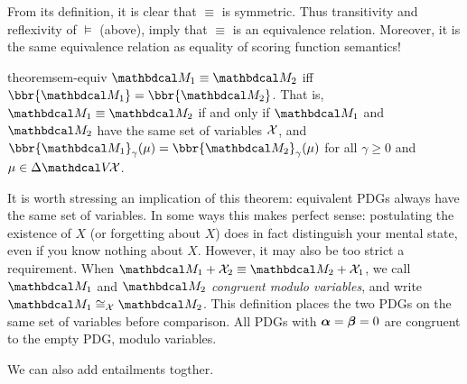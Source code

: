 From its definition, it is clear that $\equiv$ is symmetric.
Thus transitivity and reflexivity of $\models$ (above), imply that
$\equiv$ is an equivalence relation. Moreover, it is the same equivalence relation as equality of scoring function semantics!

\begin{linked}{theorem}{sem-equiv}
    $\dg M_1 \equiv \dg M_2$ iff $\bbr{\dg M_1} = \bbr{\dg M_2}$.
    That is, $\dg M_1 \equiv \dg M_2$ if and only if 
    $\dg M_1$ and $\dg M_2$ have the same set of variables $\mathcal X$, and
    $\bbr{\dg M_1}_\gamma(\mu) = \bbr{\dg M_2}_\gamma(\mu)$
    for all $\gamma \ge 0$ and $\mu \in \Delta\V\!\X$.
\end{linked}    


It is worth stressing an implication of this theorem: equivalent PDGs always have the same set of variables.
In some ways this makes perfect sense: postulating the existence of $X$ (or forgetting about $X$) does in fact distinguish your mental state, even if you know nothing about $X$. 
However, it may also be too strict a requirement.
    When $\dg M_1 + \X_2 \equiv \dg M_2 + \X_1$,
    we call $\dg M_1$ and $\dg M_2$ \emph{congruent modulo variables}, and write $\dg M_1 \cong_\X \dg M_2$.
    This definition places the two PDGs on the same set of variables before comparison.  All PDGs with $\boldsymbol\alpha = \boldsymbol\beta = 0$ are congruent to the empty PDG, modulo variables. 



We can also add entailments togther.

